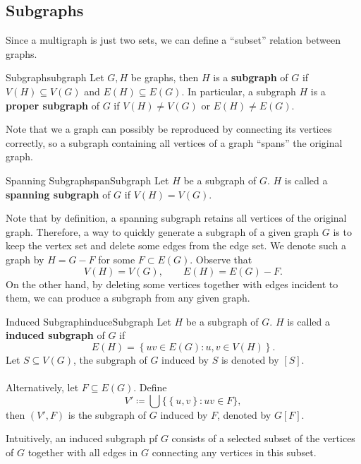 \documentclass[math, code]{amznotes}
\theoremstyle{remark}
\begin{document}
\subsection{Subgraphs}
Since a multigraph is just two sets, we can define a ``subset'' relation between graphs.
\begin{dfnbox}{Subgraph}{subgraph}
    Let $G, H$ be graphs, then $H$ is a {\color{red} \textbf{subgraph}} of $G$ if $V(H) \subseteq V(G)$ and $E(H) \subseteq E(G)$. In particular, a subgraph $H$ is a {\color{red} \textbf{proper subgraph}} of $G$ if $V(H) \neq V(G)$ or $E(H) \neq E(G)$.
\end{dfnbox}
Note that we a graph can possibly be reproduced by connecting its vertices correctly, so a subgraph containing all vertices of a graph ``spans'' the original graph.
\begin{dfnbox}{Spanning Subgraph}{spanSubgraph}
    Let $H$ be a subgraph of $G$. $H$ is called a {\color{red} \textbf{spanning subgraph}} of $G$ if $V(H) = V(G)$.
\end{dfnbox}
Note that by definition, a spanning subgraph retains all vertices of the original graph. Therefore, a way to quickly generate a subgraph of a given graph $G$ is to keep the vertex set and delete some edges from the edge set. We denote such a graph by $H = G - F$ for some $F \subset E(G)$. Observe that 
\begin{equation*}
    V(H) = V(G), \qquad E(H) = E(G) - F.
\end{equation*}
On the other hand, by deleting some vertices together with edges incident to them, we can produce a subgraph from any given graph.
\begin{dfnbox}{Induced Subgraph}{induceSubgraph}
    Let $H$ be a subgraph of $G$. $H$ is called a {\color{red} \textbf{induced subgraph}} of $G$ if
    \begin{equation*}
        E(H) = \left\{uv \in E(G) \colon u, v \in V(H)\right\}.
    \end{equation*}
    Let $S \subseteq V(G)$, the subgraph of $G$ induced by $S$ is denoted by $[S]$.
    \\\\
    Alternatively, let $F \subseteq E(G)$. Define
    \begin{equation*}
        V' \coloneqq \bigcup \bigl\{\left\{u, v\right\} \colon uv \in F\bigr\},
    \end{equation*}
    then $(V', F)$ is the subgraph of $G$ induced by $F$, denoted by $G[F]$.
\end{dfnbox}
Intuitively, an induced subgraph pf $G$ consists of a selected subset of the vertices of $G$ together with all edges in $G$ connecting any vertices in this subset.
\end{document}
